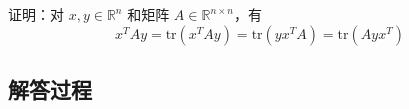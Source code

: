 \begin{example}[多重迹等式]
    证明：对 \( x, y \in \mathbb{R}^n \) 和矩阵 \( A \in \mathbb{R}^{n \times n} \)，有
    \[
    x^T A y = \text{tr}(x^T A y) = \text{tr}(y x^T A) = \text{tr}(A y x^T)
    \]
    \end{example}
    
    \subsection*{解答过程}
    